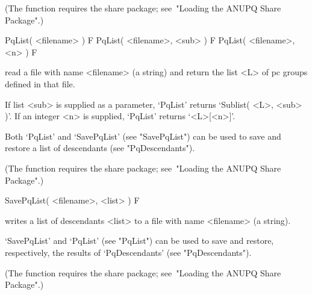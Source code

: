 (The function requires the {\ANUPQ} share package; see~"Loading the ANUPQ
Share Package".)

\>PqList( <filename> ) F
\>PqList( <filename>, <sub> ) F
\>PqList( <filename>, <n> ) F

read a file with name <filename> (a string) and return the list <L> of pc
groups defined in that file.

If list <sub> is supplied as a parameter, `PqList' returns `Sublist( <L>,
<sub> )'. If an integer <n> is supplied, `PqList' returns `<L>[<n>]'.

Both `PqList' and `SavePqList' (see "SavePqList") can be used to save and
restore a list of descendants (see "PqDescendants").

(The function requires the {\ANUPQ} share package; see~"Loading the ANUPQ
Share Package".)

\>SavePqList( <filename>, <list> ) F

writes a list of descendants <list> to a file  with  name  <filename>  (a
string).

`SavePqList' and `PqList' (see "PqList") can be used to save and restore,
respectively, the results of `PqDescendants' (see "PqDescendants").

(The function requires the {\ANUPQ} share package; see~"Loading the ANUPQ
Share Package".)

